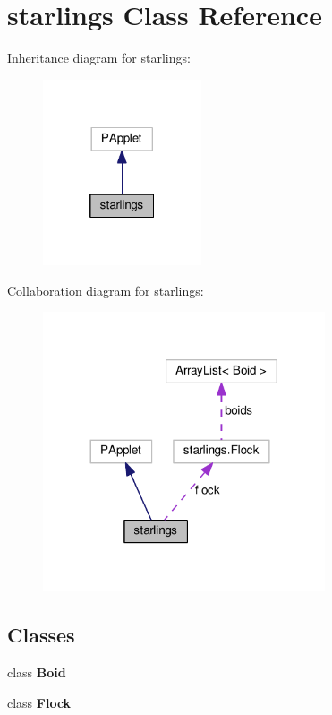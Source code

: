 \hypertarget{classstarlings}{}\section{starlings Class Reference}
\label{classstarlings}


Inheritance diagram for starlings\+:\nopagebreak
\begin{figure}[H]
\begin{center}
\leavevmode
\includegraphics[width=133pt]{classstarlings__inherit__graph}
\end{center}
\end{figure}


Collaboration diagram for starlings\+:\nopagebreak
\begin{figure}[H]
\begin{center}
\leavevmode
\includegraphics[width=236pt]{classstarlings__coll__graph}
\end{center}
\end{figure}
\subsection*{Classes}
\begin{DoxyCompactItemize}
\item 
class {\bfseries Boid}
\item 
class {\bfseries Flock}
\end{DoxyCompactItemize}
